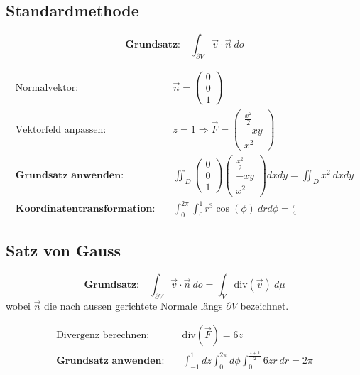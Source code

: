 \documentclass[11pt]{article}
\begin{document}
\subsection{Standardmethode}

\begin{equation*}
	\textbf{Grundsatz:}\quad\int_{\partial V} \vec{v}\cdot\vec{n}\ do
\end{equation*}

\begin{equation*}
\begin{split}
	\text{Normalvektor:}\quad & \vec{n} = \begin{pmatrix}
		0 \\ 0 \\ 1
	\end{pmatrix} \\
	\text{Vektorfeld anpassen:}\quad & z = 1 \Rightarrow \vec{F} = \begin{pmatrix}
		\frac{x^2}{2} \\ -xy \\ x^2
	\end{pmatrix} \\
	\textbf{Grundsatz anwenden:}\quad & \iint_D \begin{pmatrix}
		0 \\ 0 \\ 1
	\end{pmatrix}\begin{pmatrix}
		\frac{x^2}{2} \\ -xy \\ x^2
	\end{pmatrix} dxdy = \iint_D x^2\ dxdy \\
	\textbf{Koordinatentransformation:}\quad & \int_0^{2\pi} \int_0^1 r^3\cos(\phi)\ drd\phi = \frac{\pi}{4}
\end{split}
\end{equation*}

\subsection{Satz von Gauss}

\begin{equation*}
	\textbf{Grundsatz:}\quad\int_{\partial V} \vec{v}\cdot\vec{n}\ do = \int_V \text{div}(\vec{v})\ d\mu
\end{equation*}
wobei $\vec{n}$ die nach aussen gerichtete Normale l{\"a}ngs $\partial V$ bezeichnet.

\begin{equation*}
\begin{split}
	\text{Divergenz berechnen:}\quad & \text{div}(\vec{F}) = 6z \\
	\textbf{Grundsatz anwenden:}\quad & \int_{-1}^1 dz \int_0^{2\pi} d\phi \int_0^{\frac{z+1}{2}} 6zr\ dr = 2\pi
\end{split}
\end{equation*}
\end{document}

